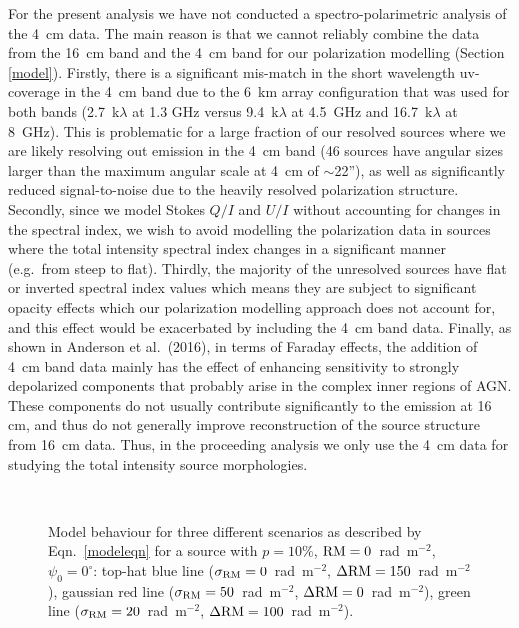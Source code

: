 \documentclass{mnras}
\newcommand*\rad{~rad~m$^{-2}$}
\newcommand*\sigmaRM{\sigma_{\rm RM}}
\newcommand*\DeltaRM{\Delta{\rm RM}}
\begin{document}
For the present analysis we have not conducted a spectro-polarimetric analysis of the 4~cm data. The main reason is that we cannot reliably combine the data from the 16~cm band and the 4~cm band for our polarization modelling (Section \ref{model}). Firstly, there is a significant mis-match in the short wavelength uv-coverage in the 4~cm band due to the 6~km array configuration that was used for both bands (2.7~k$\lambda$ at 1.3 GHz versus 9.4~k$\lambda$ at 4.5~GHz and 16.7~k$\lambda$ at 8~GHz). This is problematic for a large fraction of our resolved sources where we are likely resolving out emission in the 4~cm band (46 sources have angular sizes larger than the maximum angular scale at 4~cm of $\sim$22''), as well as significantly reduced signal-to-noise due to the heavily resolved polarization structure. Secondly, since we model Stokes $Q/I$ and $U/I$ without accounting for changes in the spectral index, we wish to avoid modelling the polarization data in sources where the total intensity spectral index changes in a significant manner (e.g.~from steep to flat). Thirdly, the majority of the unresolved sources have flat or inverted spectral index values which means they are subject to significant opacity effects which our polarization modelling approach does not account for, and this effect would be exacerbated by including the 4~cm band data. 
Finally, as shown in Anderson et al.~(2016), in terms of Faraday effects, the addition of 4~cm band data mainly has the effect of enhancing sensitivity to strongly depolarized components that probably arise in the complex inner regions of AGN. These components do not usually contribute significantly to the emission at 16 cm, and thus do not generally improve reconstruction of the source structure from 16~cm data.
Thus, in the proceeding analysis we only use the 4~cm data for studying the total intensity source morphologies. 


\begin{figure} 
\centering
  \hfill
  \\
  \caption{ {\small Model behaviour for three different scenarios as described by Eqn.~\ref{modeleqn} for a source with $p=10\%$, ${\rm RM}=0$\rad, $\psi_0=0^\circ$: top-hat blue line ($\sigmaRM=0$\rad, $\DeltaRM=150$\rad), gaussian red line ($\sigmaRM=50$\rad, $\DeltaRM=0$\rad), green line ($\sigmaRM=20$\rad, $\DeltaRM=100$\rad). } } \label{modelpfdf}
\end{figure}
\end{document}
